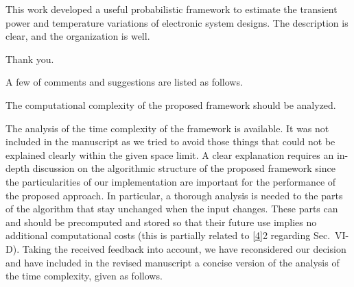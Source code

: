 \begin{reviewer}
This work developed a useful probabilistic framework to estimate the transient power and temperature variations of electronic system designs. The description is clear, and the organization is well.
\end{reviewer}
\begin{authors}
Thank you.
\end{authors}

\begin{reviewer}
A few of comments and suggestions are listed as follows.

The computational complexity of the proposed framework should be analyzed.
\end{reviewer}
\begin{authors}
The analysis of the time complexity of the framework is available.
It was not included in the manuscript as we tried to avoid those things that could not be explained clearly within the given space limit.
A clear explanation requires an in-depth discussion on the algorithmic structure of the proposed framework since the particularities of our implementation are important for the performance of the proposed approach.
In particular, a thorough analysis is needed to the parts of the algorithm that stay unchanged when the input changes.
These parts can and should be precomputed and stored so that their future use implies no additional computational costs (this is partially related to \cref{4}{2} regarding Sec.~VI-D).
Taking the received feedback into account, we have reconsidered our decision and have included in the revised manuscript a concise version of the analysis of the time complexity, given as follows.


\end{authors}
